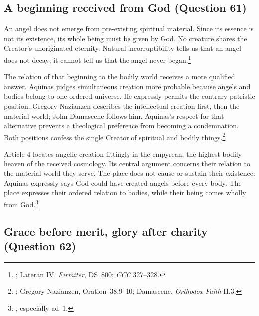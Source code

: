 \subsection{A beginning received from God (Question 61)}

An angel does not emerge from pre-existing spiritual material. Since its essence is not its existence, its whole being must be given by God. No creature shares the Creator's unoriginated eternity. Natural incorruptibility tells us that an angel does not decay; it cannot tell us that the angel never began.\footnote{; Lateran IV, \emph{Firmiter}, DS~800; \emph{CCC} 327--328.}

The relation of that beginning to the bodily world receives a more qualified answer. Aquinas judges simultaneous creation more probable because angels and bodies belong to one ordered universe. He expressly permits the contrary patristic position. Gregory Nazianzen describes the intellectual creation first, then the material world; John Damascene follows him. Aquinas's respect for that alternative prevents a theological preference from becoming a condemnation. Both positions confess the single Creator of spiritual and bodily things.\footnote{; Gregory Nazianzen, Oration~38.9--10; Damascene, \emph{Orthodox Faith} II.3.}

Article 4 locates angelic creation fittingly in the empyrean, the highest bodily heaven of the received cosmology. Its central argument concerns their relation to the material world they serve. The place does not cause or sustain their existence: Aquinas expressly says God could have created angels before every body. The place expresses their ordered relation to bodies, while their being comes wholly from God.\footnote{, especially ad~1.}


\subsection{Grace before merit, glory after charity (Question 62)}


